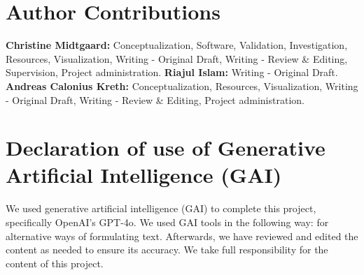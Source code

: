 \documentclass[lettersize,journal]{IEEEtran}
\begin{document}
\appendices
\section{Author Contributions}

\noindent \textbf{Christine Midtgaard:} Conceptualization, Software, Validation, Investigation, Resources, Visualization, Writing - Original Draft, Writing - Review \& Editing, Supervision, Project administration. \textbf{Riajul Islam:} Writing - Original Draft. \textbf{Andreas Calonius Kreth:} Conceptualization, Resources, Visualization, Writing - Original Draft, Writing - Review \& Editing, Project administration.

\section{Declaration of use of Generative Artificial Intelligence (GAI)}
\noindent We used generative artificial intelligence (GAI) to complete this project, specifically OpenAI's GPT-4o. We used GAI tools in the following way: for alternative ways of formulating text. Afterwards, we have reviewed and edited the content as needed to ensure its accuracy. We take full responsibility for the content of this project. 



\end{document}
